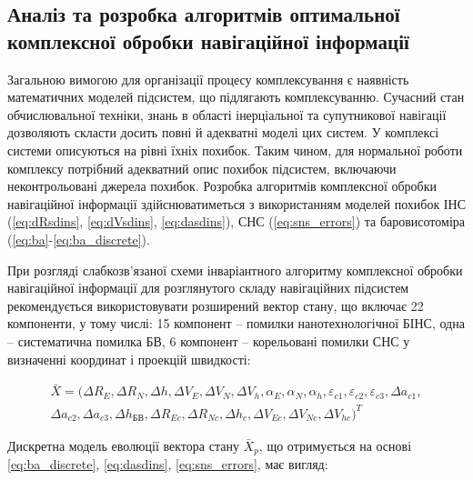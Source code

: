 \subsection{Аналіз та розробка алгоритмів оптимальної комплексної обробки
навігаційної інформації}

Загальною вимогою для організації процесу комплексування є наявність математичних 
моделей підсистем, що підлягають комплексуванню. Сучасний стан обчислювальної техніки, 
знань в області інерціальної та супутникової навігації дозволяють скласти досить 
повні й адекватні моделі цих систем. У комплексі системи описуються на рівні їхніх 
похибок. Таким чином, для нормальної роботи комплексу потрібний адекватний опис похибок 
підсистем, включаючи неконтрольовані джерела похибок. Розробка 
алгоритмів комплексної обробки навігаційної інформації здійснюватиметься з використанням 
моделей похибок ІНС (\eqref{eq:dRsdins}, \eqref{eq:dVsdins}, \eqref{eq:dasdins}), СНС (\eqref{eq:sns_errors}) 
та баровисотоміра (\eqref{eq:ba}-\eqref{eq:ba_discrete}).

При розгляді слабкозв'язаної схеми інваріантного алгоритму комплексної обробки навігаційної  
інформації для розглянутого складу навігаційних підсистем рекомендується використовувати 
розширений вектор стану, що включає 22 компоненти, у тому числі: 15 компонент -- помилки 
нанотехнологічної БІНС, одна -- систематична помилка БВ, 6 компонент -- корельовані 
помилки СНС у визначенні координат і проекцій швидкості:

\begin{equation}\label{eq:state_vector}\begin{array}{l} 
{\bar{X}=(\Delta R_{E} ,\Delta R_{N} ,\Delta h,\Delta V_{E} ,\Delta V_{N} ,\Delta V_{h} ,\alpha_{E} ,\alpha_{N} ,\alpha_{h} ,
\varepsilon_{c1} ,\varepsilon_{c2} ,\varepsilon_{c3} , \Delta a_{c1} ,} \\ 
{ \Delta a_{c2} ,\Delta a_{c3} ,\Delta h_{\text{БВ}} ,\Delta R_{Ec} ,\Delta R_{Nc} ,\Delta h_{c} ,\Delta V_{Ec} ,\Delta V_{Nc} ,\Delta V_{hc} )^{T} } 
\end{array}\end{equation}

Дискретна 
модель еволюції вектора стану $\bar{X}_{p} $, що отримується на основі \eqref{eq:ba_discrete}, 
\eqref{eq:dasdins}, \eqref{eq:sns_errors}, має вигляд:

